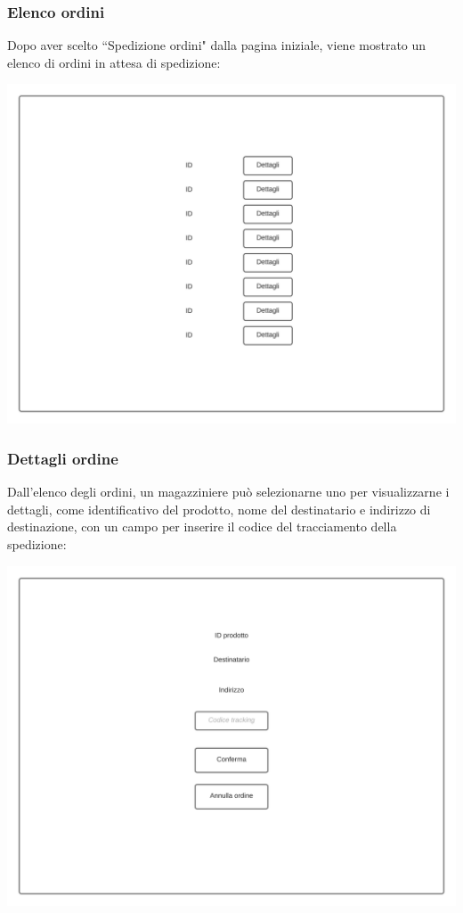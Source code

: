 \documentclass[12pt]{article}
\begin{document}
\subsubsection{Elenco ordini}
Dopo aver scelto ``Spedizione ordini" dalla pagina iniziale, viene mostrato un elenco di ordini in attesa di spedizione:

\begin{center}
\includegraphics[height=0.3\textheight]{Mockup/Magazziniere/Elenco}
\end{center}

\newpage

\subsubsection{Dettagli ordine}
Dall'elenco degli ordini, un magazziniere può selezionarne uno per visualizzarne i dettagli, come identificativo del prodotto, nome del destinatario e indirizzo di destinazione, con un campo per inserire il codice del tracciamento della spedizione:

\begin{center}
\includegraphics[height=0.3\textheight]{Mockup/Magazziniere/DettagliOrdine}
\end{center}
\end{document}
